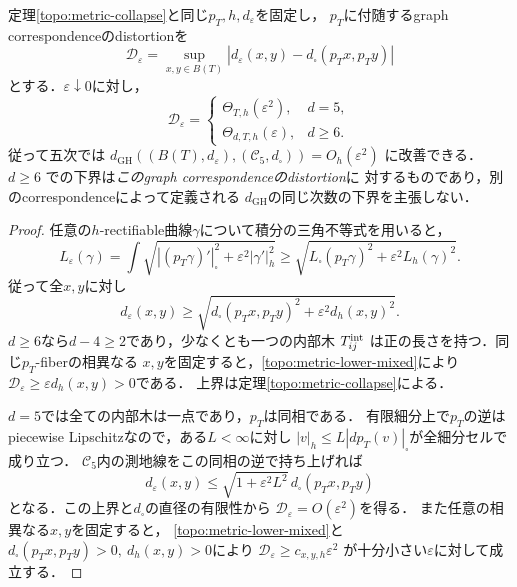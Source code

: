 \begin{proposition}[収縮速度の次数による鋭い差]\label{topo:metric-collapse-sharp}
定理\ref{topo:metric-collapse}と同じ$p_T,h,d_\varepsilon$を固定し，
$p_T$に付随するgraph correspondenceのdistortionを
\[
 \mathcal D_\varepsilon=
 \sup_{x,y\in B(T)}
 \left|d_\varepsilon(x,y)-d_\square(p_Tx,p_Ty)\right|
\]
とする．$\varepsilon\downarrow0$に対し，
\[
 \mathcal D_\varepsilon=
 \begin{cases}
  \Theta_{T,h}(\varepsilon^2),&d=5,\\
  \Theta_{d,T,h}(\varepsilon),&d\ge6.
 \end{cases}
\]
従って五次では
$d_{\mathrm{GH}}((B(T),d_\varepsilon),(\mathcal C_5,d_\square))
=O_h(\varepsilon^2)$ に改善できる．
$d\ge6$ での下界は\emph{このgraph correspondenceのdistortion}に
対するものであり，別のcorrespondenceによって定義される
$d_{\mathrm{GH}}$の同じ次数の下界を主張しない．
\end{proposition}
\begin{proof}
任意の$h$-rectifiable曲線$\gamma$について積分の三角不等式を用いると，
\[
 L_\varepsilon(\gamma)
 =\int\sqrt{|(p_T\gamma)'|_\square^2
                  +\varepsilon^2|\gamma'|_h^2}
 \ge\sqrt{L_\square(p_T\gamma)^2+
                          \varepsilon^2L_h(\gamma)^2}.
\]
従って全$x,y$に対し
\begin{equation}\label{topo:metric-lower-mixed}
 d_\varepsilon(x,y)
 \ge\sqrt{d_\square(p_Tx,p_Ty)^2+\varepsilon^2d_h(x,y)^2}.
\end{equation}
$d\ge6$なら$d-4\ge2$であり，少なくとも一つの内部木
$T_{ij}^{\rm int}$ は正の長さを持つ．同じ$p_T$-fiberの相異なる
$x,y$を固定すると，\eqref{topo:metric-lower-mixed}により
$\mathcal D_\varepsilon\ge\varepsilon d_h(x,y)>0$である．
上界は定理\ref{topo:metric-collapse}による．

$d=5$では全ての内部木は一点であり，$p_T$は同相である．
有限細分上で$p_T$の逆はpiecewise Lipschitzなので，ある$L<\infty$に対し
$|v|_h\le L|dp_T(v)|_\square$が全細分セルで成り立つ．
$\mathcal C_5$内の測地線をこの同相の逆で持ち上げれば
\[
 d_\varepsilon(x,y)\le
   \sqrt{1+\varepsilon^2L^2}\,d_\square(p_Tx,p_Ty)
\]
となる．この上界と$d_\square$の直径の有限性から
$\mathcal D_\varepsilon=O(\varepsilon^2)$を得る．
また任意の相異なる$x,y$を固定すると，
\eqref{topo:metric-lower-mixed}と
$d_\square(p_Tx,p_Ty)>0,\ d_h(x,y)>0$により
$\mathcal D_\varepsilon\ge c_{x,y,h}\varepsilon^2$
が十分小さい$\varepsilon$に対して成立する．
\end{proof}

